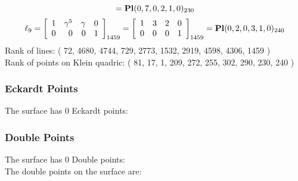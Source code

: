 \documentclass{article}
\begin{document}
{$$={\rm\bf Pl}(0,7,0,2,1,0 )_{230}$$
$$
\ell_{9} = 
\left[
\begin{array}{*{4}{r}}
1 & \gamma^{5} & \gamma  & 0\\
0 & 0 & 0 & 1\\
\end{array}
\right]
_{1459}
=
\left[
\begin{array}{*{4}c}
1  & 3  & 2  & 0\\
0  & 0  & 0  & 1\\
\end{array}
\right]_{1459}
={\rm\bf Pl}(0,2,0,3,1,0 )_{240}$$
Rank of lines: ( 72, 4680, 4744, 729, 2773, 1532, 2919, 4598, 4306, 1459 )\\
Rank of points on Klein quadric: ( 81, 17, 1, 209, 272, 255, 302, 290, 230, 240 )\\
\subsubsection*{Eckardt Points}
The surface has 0 Eckardt points:\\
\subsubsection*{Double Points}
The surface has 0 Double points:\\
The double points on the surface are:\\
\begin{multicols}{2}
\noindent
\end{multicols}
}
\end{document}
